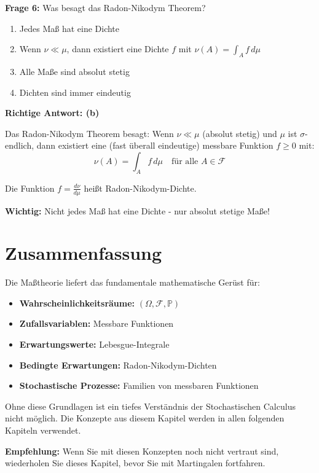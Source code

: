 \begin{multiplechoice}
\textbf{Frage 6:} Was besagt das Radon-Nikodym Theorem?

\begin{enumerate}[label=(\alph*)]
    \item Jedes Maß hat eine Dichte
    \item Wenn $\nu \ll \mu$, dann existiert eine Dichte $f$ mit $\nu(A) = \int_A f \, d\mu$
    \item Alle Maße sind absolut stetig
    \item Dichten sind immer eindeutig
\end{enumerate}

\begin{solution}
\textbf{Richtige Antwort: (b)}

Das Radon-Nikodym Theorem besagt: Wenn $\nu \ll \mu$ (absolut stetig) und $\mu$ ist $\sigma$-endlich, dann existiert eine (fast überall eindeutige) messbare Funktion $f \geq 0$ mit:
\[
\nu(A) = \int_A f \, d\mu \quad \text{für alle } A \in \mathcal{F}
\]

Die Funktion $f = \frac{d\nu}{d\mu}$ heißt Radon-Nikodym-Dichte.

\textbf{Wichtig:} Nicht jedes Maß hat eine Dichte - nur absolut stetige Maße!
\end{solution}
\end{multiplechoice}

\section{Zusammenfassung}

Die Maßtheorie liefert das fundamentale mathematische Gerüst für:
\begin{itemize}
    \item \textbf{Wahrscheinlichkeitsräume:} $(\Omega, \mathcal{F}, \mathbb{P})$
    \item \textbf{Zufallsvariablen:} Messbare Funktionen
    \item \textbf{Erwartungswerte:} Lebesgue-Integrale
    \item \textbf{Bedingte Erwartungen:} Radon-Nikodym-Dichten
    \item \textbf{Stochastische Prozesse:} Familien von messbaren Funktionen
\end{itemize}

Ohne diese Grundlagen ist ein tiefes Verständnis der Stochastischen Calculus nicht möglich. Die Konzepte aus diesem Kapitel werden in allen folgenden Kapiteln verwendet.

\textbf{Empfehlung:} Wenn Sie mit diesen Konzepten noch nicht vertraut sind, wiederholen Sie dieses Kapitel, bevor Sie mit Martingalen fortfahren.
